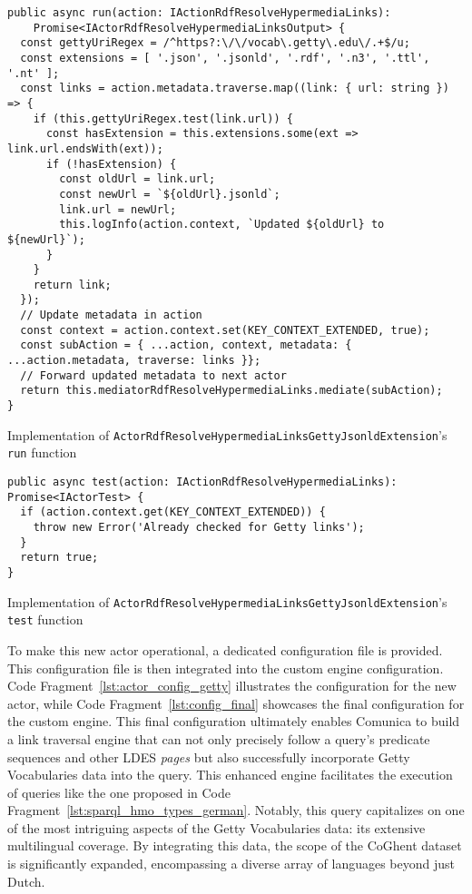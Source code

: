 \begin{listing}[htbp]
    \begin{verbatim}
public async run(action: IActionRdfResolveHypermediaLinks):
    Promise<IActorRdfResolveHypermediaLinksOutput> {
  const gettyUriRegex = /^https?:\/\/vocab\.getty\.edu\/.+$/u;
  const extensions = [ '.json', '.jsonld', '.rdf', '.n3', '.ttl', '.nt' ];
  const links = action.metadata.traverse.map((link: { url: string }) => {
    if (this.gettyUriRegex.test(link.url)) {
      const hasExtension = this.extensions.some(ext => link.url.endsWith(ext));
      if (!hasExtension) {
        const oldUrl = link.url;
        const newUrl = `${oldUrl}.jsonld`;
        link.url = newUrl;
        this.logInfo(action.context, `Updated ${oldUrl} to ${newUrl}`);
      }
    }
    return link;
  });
  // Update metadata in action
  const context = action.context.set(KEY_CONTEXT_EXTENDED, true);
  const subAction = { ...action, context, metadata: { ...action.metadata, traverse: links }};
  // Forward updated metadata to next actor
  return this.mediatorRdfResolveHypermediaLinks.mediate(subAction);
}
    \end{verbatim}
    \caption{Implementation of \texttt{ActorRdfResolveHypermediaLinksGettyJsonldExtension}'s \texttt{run} function}
    \label{lst:actor_getty_run}
\end{listing}

\begin{listing}[htbp]
    \begin{verbatim}
public async test(action: IActionRdfResolveHypermediaLinks): Promise<IActorTest> {
  if (action.context.get(KEY_CONTEXT_EXTENDED)) {
    throw new Error('Already checked for Getty links');
  }
  return true;
}
    \end{verbatim}
    \caption{Implementation of \texttt{ActorRdfResolveHypermediaLinksGettyJsonldExtension}'s \texttt{test} function}
    \label{lst:actor_getty_test}
\end{listing}

To make this new actor operational, a dedicated configuration file is provided. This configuration file is then integrated into the custom engine configuration. Code Fragment~\ref{lst:actor_config_getty} illustrates the configuration for the new actor, while Code Fragment~\ref{lst:config_final} showcases the final configuration for the custom engine. This final configuration ultimately enables Comunica to build a link traversal engine that can not only precisely follow a query's predicate sequences and other LDES \textit{pages} but also successfully incorporate Getty Vocabularies data into the query. This enhanced engine facilitates the execution of queries like the one proposed in Code Fragment~\ref{lst:sparql_hmo_types_german}. Notably, this query capitalizes on one of the most intriguing aspects of the Getty Vocabularies data: its extensive multilingual coverage. By integrating this data, the scope of the CoGhent dataset is significantly expanded, encompassing a diverse array of languages beyond just Dutch.

